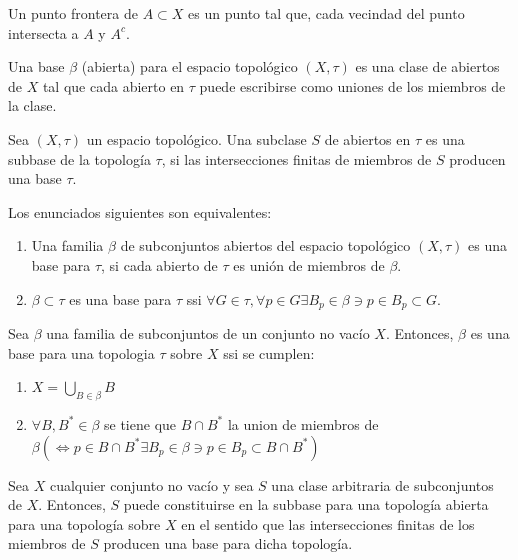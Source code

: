 \begin{definicion}
    Un punto frontera de $A\subset X$ es un punto tal que, cada vecindad del punto intersecta a $A$ y $A^c$.
\end{definicion}

 

\begin{definicion}
    Una base $\beta$ (abierta) para el espacio topológico $(X,\tau)$ es una clase de abiertos de $X$ tal que cada abierto en $\tau$ puede escribirse como uniones de los miembros de la clase. 
\end{definicion}


\begin{definicion}
    Sea $(X,\tau)$ un espacio topológico. Una subclase $S$ de abiertos en $\tau$ es una subbase de la topología $\tau$, si las intersecciones finitas de miembros de $S$ producen una base $\tau$. 
\end{definicion}

\begin{teorema}
    Los enunciados siguientes son equivalentes:
    \begin{enumerate}
        \item Una familia $\beta$ de subconjuntos abiertos del espacio topológico $(X,\tau)$ es una base para $\tau$, si cada abierto de $\tau$ es unión de miembros de $\beta$.
        \item $\beta\subset \tau$ es una base para $\tau$ ssi $\forall G\in \tau,\forall p\in G\exists B_p\in \beta \ni p\in B_p\subset G$.
    \end{enumerate}
\end{teorema}

\begin{teorema}
    Sea $\beta$ una familia de subconjuntos de un conjunto no vacío $X$. Entonces, $\beta$ es una base para una topologia $\tau$ sobre $X$ ssi se cumplen: 
    \begin{enumerate}
        \item $X=\bigcup_{B\in\beta}B$
        \item $\forall B,B^*\in \beta$ se tiene que $B\cap B^*$ la union de miembros de $\beta(\iff p\in B\cap B^*\exists B_p\in \beta \ni p\in B_p\subset B\cap B^*)$
    \end{enumerate}
\end{teorema}



\begin{teorema}
    Sea $X$ cualquier conjunto no vacío y sea $S$ una clase arbitraria de subconjuntos de $X$. Entonces, $S$ puede constituirse en la subbase para una topología abierta para una topología sobre $X$ en el sentido que las intersecciones finitas de los miembros de $S$ producen una base para dicha topología. 
\end{teorema}

